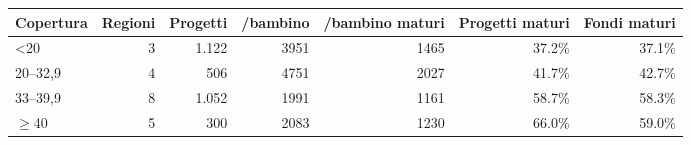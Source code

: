 \begin{tabular}{lrrrrrr}
\toprule
Copertura & Regioni & Progetti & \texteuro{}/bambino & \texteuro{}/bambino maturi & Progetti maturi & Fondi maturi \\
\midrule
<20 & 3 & 1.122 & 3951 & 1465 & 37.2\% & 37.1\% \\
20--32,9 & 4 & 506 & 4751 & 2027 & 41.7\% & 42.7\% \\
33--39,9 & 8 & 1.052 & 1991 & 1161 & 58.7\% & 58.3\% \\
\(\geq\)40 & 5 & 300 & 2083 & 1230 & 66.0\% & 59.0\% \\
\bottomrule
\end{tabular}
